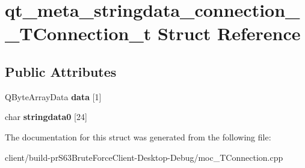 \hypertarget{structqt__meta__stringdata__connection_____t_connection__t}{}\section{qt\+\_\+meta\+\_\+stringdata\+\_\+connection\+\_\+\+\_\+\+T\+Connection\+\_\+t Struct Reference}
\label{structqt__meta__stringdata__connection_____t_connection__t}
\subsection*{Public Attributes}
\begin{DoxyCompactItemize}
\item 
\mbox{\label{structqt__meta__stringdata__connection_____t_connection__t_af86b72795d4694a5d71c5f19bdccd171}} 
Q\+Byte\+Array\+Data {\bfseries data} \mbox{[}1\mbox{]}
\item 
\mbox{\label{structqt__meta__stringdata__connection_____t_connection__t_a29646af165019345c7d0256cfa49c6d9}} 
char {\bfseries stringdata0} \mbox{[}24\mbox{]}
\end{DoxyCompactItemize}


The documentation for this struct was generated from the following file\+:\begin{DoxyCompactItemize}
\item 
client/build-\/pr\+S63\+Brute\+Force\+Client-\/\+Desktop-\/\+Debug/moc\+\_\+\+T\+Connection.\+cpp\end{DoxyCompactItemize}
